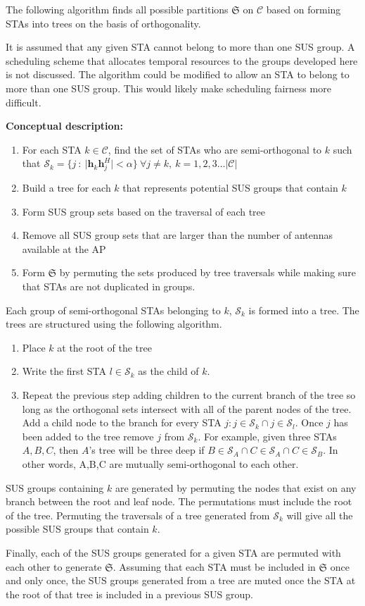 The following algorithm finds all possible partitions $\mathfrak{S}$ on $\mathcal{C}$ based on forming STAs into trees on the basis of orthogonality.

It is assumed that any given STA cannot belong to more than one SUS group. A scheduling scheme that allocates temporal resources to the groups developed here is not discussed. The algorithm could be modified to allow an STA to belong to more than one SUS group. This would likely make scheduling fairness more difficult.

\textbf{Conceptual description:}
\begin{enumerate}
    \item For each STA $k \in \mathcal{C}$, find the set of STAs who are semi-orthogonal to $k$ such that $\mathcal{S}_k = \lbrace j\ : \ \vert \textbf{h}_k \textbf{h}_j^H \vert < \alpha \rbrace \ \forall j \neq k,\ k = 1,2,3\ldots\vert\mathcal{C}\vert$
    \item Build a tree for each $k$ that represents potential SUS groups that contain $k$
    \item Form SUS group sets based on the traversal of each tree
    \item Remove all SUS group sets that are larger than the number of antennas available at the AP
    \item Form $\mathfrak{S}$ by permuting the sets produced by tree traversals while making sure that STAs are not duplicated in groups.
\end{enumerate}

Each group of semi-orthogonal STAs belonging to $k$, $\mathcal{S}_k$ is formed into a tree. The trees are structured using the following algorithm.
\begin{enumerate}
    \item Place $k$ at the root of the tree
    \item Write the first STA $l \in \mathcal{S}_k$ as the child of $k$.
    \item Repeat the previous step adding children to the current branch of the tree so long as the orthogonal sets intersect with all of the parent nodes of the tree. Add a child node to the branch for every STA $j : j \in \mathcal{S}_k \cap j \in \mathcal{S}_l$. Once $j$ has been added to the tree remove $j$ from $\mathcal{S}_k$.
    For example, given three STAs $A,B,C$, then $A$'s tree will be three deep if $B\in\mathcal{S}_A \cap C\in \mathcal{S}_A \cap C \in \mathcal{S}_B$. In other words, A,B,C are mutually semi-orthogonal to each other.
\end{enumerate}

SUS groups containing $k$ are generated by permuting the nodes that exist on any branch between the root and leaf node. The permutations must include the root of the tree. Permuting the traversals of a tree generated from $\mathcal{S}_k$ will give all the possible SUS groups that contain $k$.

Finally, each of the SUS groups generated for a given STA are permuted with each other to generate $\mathfrak{S}$. Assuming that each STA must be included in $\mathfrak{S}$ once and only once, the SUS groups generated from a tree are muted once the STA at the root of that tree is included in a previous SUS group.